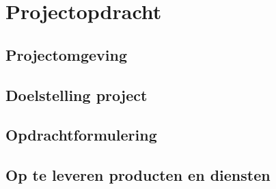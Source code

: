 \section{Projectopdracht}
\label{projectopdracht}



\subsection{Projectomgeving}


\subsection{Doelstelling project}

\subsection{Opdrachtformulering}

\subsection{Op te leveren producten en diensten}


